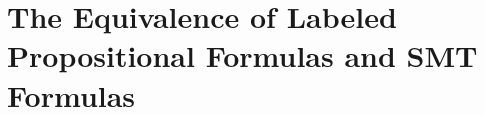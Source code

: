 \section{The Equivalence of Labeled Propositional Formulas and SMT Formulas}
\label{app:labeled_prop_to_SMT}












